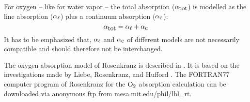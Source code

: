 For oxygen -- like for water vapor -- the total absorption 
($\alpha_{\mbox{\rm \small tot}}$) is modelled as the line absorption ($\alpha_{\ell}$) plus a  
continuum absorption ($\alpha_{\mbox{\small c}}$):
\begin{equation}
  \label{eq:o2:totabs}
  \alpha_{\mbox{\rm \small tot}} = \alpha_{\ell} + \alpha_{\mbox{\small c}}
\end{equation}
It has to be emphasized that, $\alpha_{\ell}$ and $\alpha_{\mbox{\small c}}$ of different
models are not necessarily compatible and should therefore not be interchanged.




\label{leveld:O2_pwr98}


\label{levele:pwr93_o2lines}
The oxygen absorption model of Rosenkranz is described in \cite{pwr:93}. It 
is based on the investigations made by Liebe, Rosenkranz, and Hufford 
\cite{liebeetal:92}. The FORTRAN77 computer program of Rosenkranz for 
the $\mbox{O}_2$ absorption calculation can be downloaded via anonymous ftp from 
mesa.mit.edu/phil/lbl\_rt.


